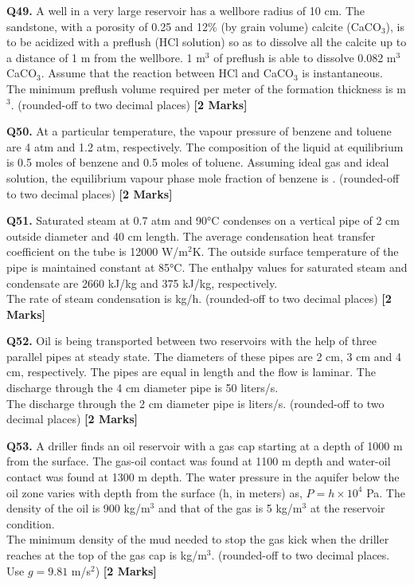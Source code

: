 \documentclass[11pt]{article}
\newcommand{\questionb}[2]{
    \noindent\textbf{Q#2.} #1 \hfill \textbf{[2 Marks]}
}
\begin{document}
\questionb{A well in a very large reservoir has a wellbore radius of 10 cm. The sandstone, with a porosity of 0.25 and 12\% (by grain volume) calcite (CaCO\(_3\)), is to be acidized with a preflush (HCl solution) so as to dissolve all the calcite up to a distance of 1 m from the wellbore. 1 m\(^3\) of preflush is able to dissolve 0.082 m\(^3\) CaCO\(_3\). Assume that the reaction between HCl and CaCO\(_3\) is instantaneous. \\
The minimum preflush volume required per meter of the formation thickness is \underline{\hspace{3cm}} m\(^3\). (rounded-off to two decimal places)}{49}
\vspace{0.5cm}

\questionb{At a particular temperature, the vapour pressure of benzene and toluene are 4 atm and 1.2 atm, respectively. The composition of the liquid at equilibrium is 0.5 moles of benzene and 0.5 moles of toluene. Assuming ideal gas and ideal solution, the equilibrium vapour phase mole fraction of benzene is \underline{\hspace{3cm}}. (rounded-off to two decimal places)}{50}
\vspace{0.5cm}

\questionb{Saturated steam at 0.7 atm and 90°C condenses on a vertical pipe of 2 cm outside diameter and 40 cm length. The average condensation heat transfer coefficient on the tube is 12000 W/m\(^2\)K. The outside surface temperature of the pipe is maintained constant at 85°C. The enthalpy values for saturated steam and condensate are 2660 kJ/kg and 375 kJ/kg, respectively. \\
The rate of steam condensation is \underline{\hspace{3cm}} kg/h. (rounded-off to two decimal places)}{51}
\vspace{0.5cm}

\questionb{Oil is being transported between two reservoirs with the help of three parallel pipes at steady state. The diameters of these pipes are 2 cm, 3 cm and 4 cm, respectively. The pipes are equal in length and the flow is laminar. The discharge through the 4 cm diameter pipe is 50 liters/s. \\
The discharge through the 2 cm diameter pipe is \underline{\hspace{3cm}} liters/s. (rounded-off to two decimal places)}{52}
\vspace{0.5cm}

\questionb{A driller finds an oil reservoir with a gas cap starting at a depth of 1000 m from the surface. The gas-oil contact was found at 1100 m depth and water-oil contact was found at 1300 m depth. The water pressure in the aquifer below the oil zone varies with depth from the surface (h, in meters) as, \( P = h \times 10^4 \) Pa. The density of the oil is 900 kg/m\(^3\) and that of the gas is 5 kg/m\(^3\) at the reservoir condition. \\
The minimum density of the mud needed to stop the gas kick when the driller reaches at the top of the gas cap is \underline{\hspace{3cm}} kg/m\(^3\). (rounded-off to two decimal places. Use \( g = 9.81 \) m/s\(^2\))}{53}
\vspace{0.5cm}
\end{document}

